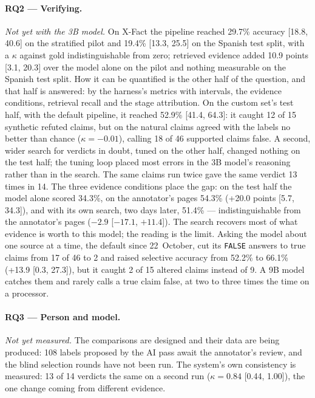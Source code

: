 \paragraph{RQ2 --- Verifying.} \emph{Not yet with the 3B model.} On X-Fact the pipeline reached 29.7\% accuracy
[18.8, 40.6] on the stratified pilot and 19.4\% [13.3, 25.5] on the
Spanish test split, with a $\kappa$ against gold indistinguishable from
zero; retrieved evidence added 10.9 points [3.1, 20.3] over the model
alone on the pilot and nothing measurable on the Spanish test split.
How it can be quantified is the other half of the question, and that
half is answered: by the harness's metrics with intervals, the evidence
conditions, retrieval recall and the stage attribution. On the custom
set's test half, with the default pipeline, it reached 52.9\% [41.4,
64.3]: it caught 12 of 15 synthetic refuted claims, but on the natural
claims agreed with the labels no better than chance ($\kappa = -0.01$),
calling 18 of 46 supported claims false. A second, wider search for
verdicts in doubt, tuned on the other half, changed nothing on the
test half; the tuning loop placed most errors in the 3B model's
reasoning rather than in the search. The same claims run twice gave the
same verdict 13 times in 14. The three evidence conditions place the
gap: on the test half the model alone scored 34.3\%, on the annotator's
pages 54.3\% (+20.0 points [5.7, 34.3]), and with its own search, two
days later, 51.4\% --- indistinguishable from the annotator's pages
($-2.9$ [$-17.1$, $+11.4$]). The search recovers most of what evidence
is worth to this model; the reading is the limit. Asking the model about
one source at a time, the default since 22~October, cut its
\texttt{FALSE} answers to true claims from 17 of 46 to 2 and raised
selective accuracy from 52.2\% to 66.1\% (+13.9 [0.3, 27.3]), but it
caught 2 of 15 altered claims instead of 9. A 9B model catches them and
rarely calls a true claim false, at two to three times the time on a
processor.

\paragraph{RQ3 --- Person and model.} \emph{Not yet measured.} The
comparisons are designed and their data are being produced: 108 labels
proposed by the AI pass await the annotator's review, and the blind
selection rounds have not been run. The system's own consistency is
measured: 13 of 14 verdicts the same on a second run ($\kappa = 0.84$
[0.44, 1.00]), the one change coming from different evidence.

